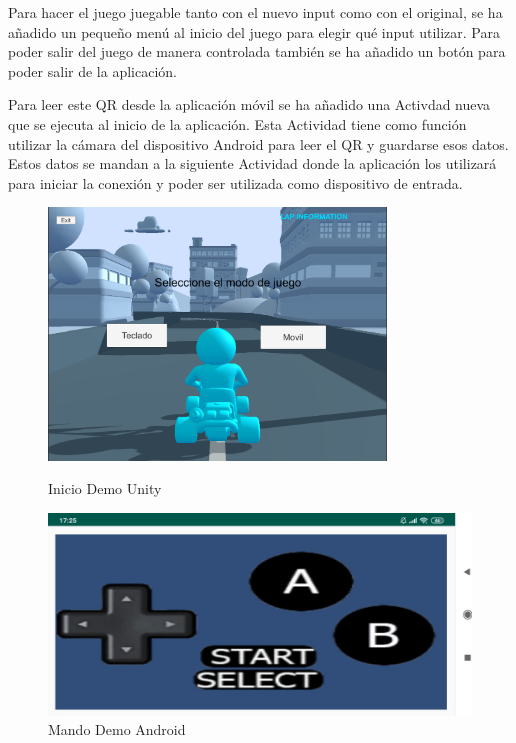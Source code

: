Para hacer el juego juegable tanto con el nuevo input como con el original, se ha a\~nadido un peque\~no men\'u al inicio del juego para elegir qu\'e input utilizar. Para poder salir del juego de manera controlada tambi\'en se ha a\~nadido un bot\'on para poder salir de la aplicaci\'on.

Para leer este QR desde la aplicaci\'on m\'ovil se ha a\~nadido una Activdad nueva que se ejecuta al inicio de la aplicaci\'on. Esta Actividad tiene como funci\'on utilizar la c\'amara del dispositivo Android para leer el QR y guardarse esos datos. Estos datos se mandan a la siguiente Actividad donde la aplicaci\'on los utilizar\'a para iniciar la conexi\'on y poder ser utilizada como dispositivo de entrada.

\begin{figure}[!htb]
\begin{minipage}{0.5\textwidth}
\centering
\includegraphics[width=0.8\textwidth]{./Imagenes/Bitmap/Menu_Principal_Juego}
\caption{Inicio Demo Unity}
\end{minipage}\hfill
\begin{minipage}{0.6\textwidth}
\centering
\includegraphics[width=1.0\textwidth]{./Imagenes/Bitmap/Mando}
\caption{Mando Demo Android}
\end{minipage}
\end{figure}

